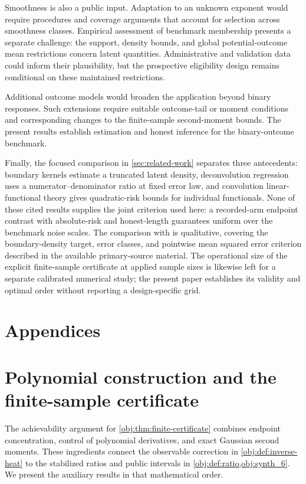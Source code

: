 \documentclass[11pt]{article}
\begin{document}
Smoothness is also a public input. Adaptation to an unknown exponent would require procedures and coverage arguments that account for selection across smoothness classes. Empirical assessment of benchmark membership presents a separate challenge: the support, density bounds, and global potential-outcome mean restrictions concern latent quantities. Administrative and validation data could inform their plausibility, but the prospective eligibility design remains conditional on these maintained restrictions.

Additional outcome models would broaden the application beyond binary responses. Such extensions require suitable outcome-tail or moment conditions and corresponding changes to the finite-sample second-moment bounds. The present results establish estimation and honest inference for the binary-outcome benchmark.

Finally, the focused comparison in \cref{sec:related-work} separates three antecedents: boundary kernels estimate a truncated latent density, deconvolution regression uses a numerator--denominator ratio at fixed error law, and convolution linear-functional theory gives quadratic-risk bounds for individual functionals. None of these cited results supplies the joint criterion used here: a recorded-arm endpoint contrast with absolute-risk and honest-length guarantees uniform over the benchmark noise scales. The comparison with \citet{ZhangKarunamuni2009Boundary} is qualitative, covering the boundary-density target, error classes, and pointwise mean squared error criterion described in the available primary-source material. The operational size of the explicit finite-sample certificate at applied sample sizes is likewise left for a separate calibrated numerical study; the present paper establishes its validity and optimal order without reporting a design-specific grid.


\appendix

\section*{Appendices}

\section{Polynomial construction and the finite-sample certificate}

The achievability argument for \cref{obj:thm:finite-certificate} combines endpoint concentration, control of polynomial derivatives, and exact Gaussian second moments. These ingredients connect the observable correction in \cref{obj:def:inverse-heat} to the stabilized ratios and public intervals in \cref{obj:def:ratio,obj:synth_6}. We present the auxiliary results in that mathematical order.
\end{document}

